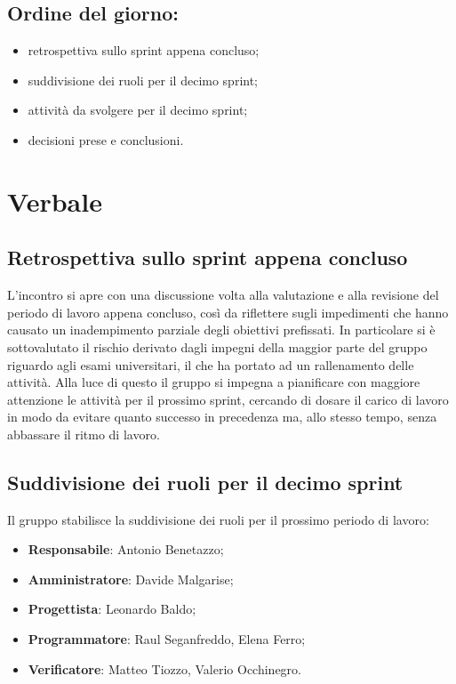 \documentclass[italian,12pt]{article}
\begin{document}
\subsection*{Ordine del giorno:}
\begin{itemize}
	\item retrospettiva sullo sprint appena concluso;
	\item suddivisione dei ruoli per il decimo sprint;
	\item attività da svolgere per il decimo sprint;
	\item decisioni prese e conclusioni.
\end{itemize}


\newpage

\section{Verbale}

\subsection{Retrospettiva sullo sprint appena concluso}
L'incontro si apre con una discussione volta alla valutazione e alla revisione del periodo di lavoro appena concluso, così da riflettere sugli impedimenti che hanno causato un inadempimento
parziale degli obiettivi prefissati. In particolare si è sottovalutato il rischio derivato dagli impegni della maggior parte del gruppo riguardo agli esami universitari, il che ha portato
ad un rallenamento delle attività. Alla luce di questo il gruppo si impegna a pianificare con maggiore attenzione le attività per il prossimo sprint, cercando di dosare il carico di lavoro
in modo da evitare quanto successo in precedenza ma, allo stesso tempo, senza abbassare il ritmo di lavoro. \\

\subsection{Suddivisione dei ruoli per il decimo sprint}
Il gruppo stabilisce la suddivisione dei ruoli per il prossimo periodo di lavoro:
\begin{itemize}
	\item \textbf{Responsabile}: Antonio Benetazzo;
	\item \textbf{Amministratore}: Davide Malgarise;
	\item \textbf{Progettista}: Leonardo Baldo;
	\item \textbf{Programmatore}: Raul Seganfreddo, Elena Ferro;
	\item \textbf{Verificatore}: Matteo Tiozzo, Valerio Occhinegro.
\end{itemize}
\end{document}
